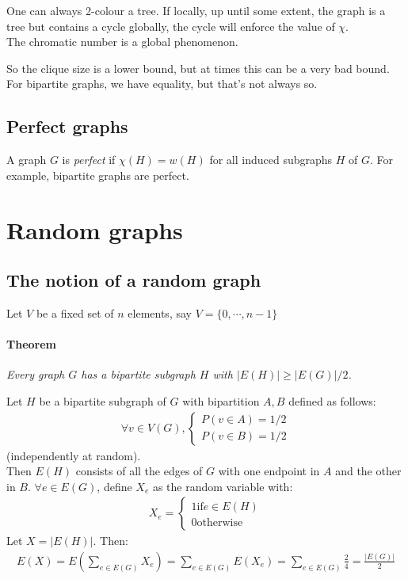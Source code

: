 \documentclass[11pt]{book}
\begin{document}
		One can always 2-colour a tree. If locally, up until some extent, the graph is a tree but contains a cycle globally, the cycle will enforce the value of $\chi$.\\
		
		The chromatic number is a global phenomenon.
		
	So the clique size is a lower bound, but at times this can be a very bad bound. For bipartite graphs, we have equality, but that's not always so.
	
	\section{Perfect graphs}
		A graph $G$ is \textit{perfect} if $\chi(H) = w(H)$ for all induced subgraphs $H$ of $G$. For example, bipartite graphs are perfect.
		
		
\chapter{Random graphs}

\section{The notion of a random graph}
Let $V$ be a fixed set of $n$ elements, say $V = \{0, \dotsb, n-1\}$
\subsubsection{Theorem}
\textit{Every graph $G$ has a bipartite subgraph $H$ with $|E(H)| \geq |E(G)|/2$.\\}

Let $H$ be a bipartite subgraph of $G$ with bipartition $A,B$ defined as follows:
\begin{eqnarray}
	\forall v \in V(G), \begin{cases}
		P(v \in A) = 1/2 \\
		P(v \in B) = 1/2 
	\end{cases}
\end{eqnarray}
(independently at random).\\

Then $E(H)$ consists of all the edges of $G$ with one endpoint in $A$ and the other in $B$. $\forall e \in E(G)$, define $X_e$ as the random variable with:
\begin{eqnarray}
	X_e = \begin{cases}
		1 \text{if} e \in E(H)\\
		0 \text{otherwise}
	\end{cases}
\end{eqnarray}
Let $X = |E(H)|$. Then:
\begin{eqnarray}
	E(X) = E(\sum_{e \in E(G)} X_e) = \sum_{e \in E(G)} E(X_e) = \sum_{e \in E(G)} \frac{2}{4} = \frac{|E(G)|}{2}
\end{eqnarray}
\end{document}

